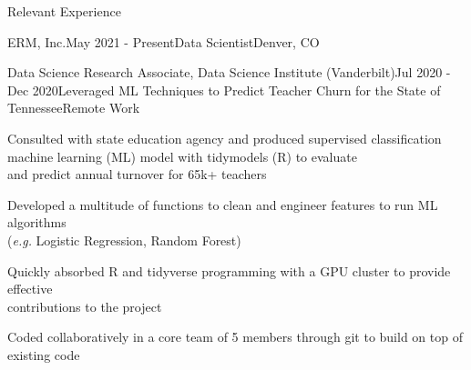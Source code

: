 \documentclass{resume} %
\newcommand{\commentblock}[1]{}
\begin{document}
\begin{rSection}{Relevant Experience}
\begin{rSubsection}{ERM, Inc.}{May 2021 - Present}{Data Scientist}{Denver, CO}
\commentblock{
    \item {Constructed Custom GIS Tool to Quantify Forest Quality Around the Globe: Used python and ArcGIS to create ArcPro toolbox}
        \vspace{-0.5em}
        \subitem{$\cdot$ Utilized the pythonic arcpy module to generate a custom tool that allows the user to acquire forest quality around the globe}
        \vspace{-0.5em}
        \subitem {$\cdot$ Leveraged pythonic methods to create tool with simple interface for user and readable reports}
        \vspace{0.25em}
    \item {Selected to lead the changes for advanced computational infrastructure for N. American \\ Data Science teams}
}
\end{rSubsection} 


\begin{rSubsection}{Data Science Research Associate, Data Science Institute (Vanderbilt)}{Jul 2020 - Dec 2020}{Leveraged ML Techniques to Predict Teacher Churn for the State of Tennessee}{Remote Work} 
\item {Consulted with state education agency and produced supervised classification machine learning (ML) model with tidymodels (R) to evaluate \\ and predict annual turnover for 65k+ teachers }
\item {Developed a multitude of functions to clean and engineer features to run ML algorithms \\ (\emph{e.g.} Logistic Regression, Random Forest)}
\item {Quickly absorbed R and tidyverse programming with a GPU cluster to provide effective \\ contributions to the project}
\item {Coded collaboratively in a core team of 5 members through git to build on top of existing code}

\end{rSubsection} 



\end{rSection}
\end{document}
